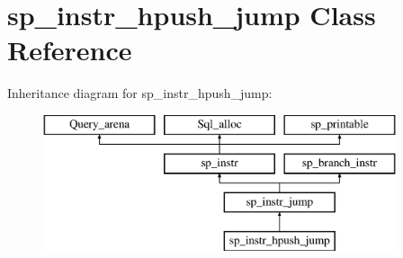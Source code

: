 \hypertarget{classsp__instr__hpush__jump}{}\section{sp\+\_\+instr\+\_\+hpush\+\_\+jump Class Reference}
\label{classsp__instr__hpush__jump}
Inheritance diagram for sp\+\_\+instr\+\_\+hpush\+\_\+jump\+:\begin{figure}[H]
\begin{center}
\leavevmode
\includegraphics[height=4.000000cm]{classsp__instr__hpush__jump}
\end{center}
\end{figure}
